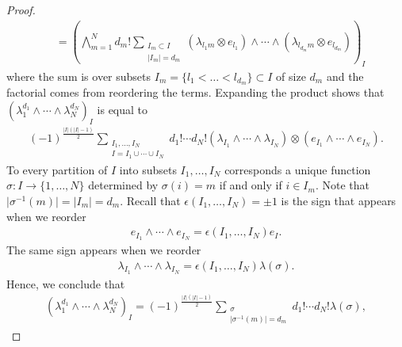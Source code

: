 \documentclass[a4paper,11pt]{amsart} %
\newcommand{\8}{\infty}
\theoremstyle{mytheoremstyle}
\theoremstyle{remark}
\numberwithin{equation}{section}
\begin{document}
\begin{proof}
\begin{align}
& = \left ( \bigwedge_{m=1}^N d_m! \sum_{\substack{I_m \subset I \\ \vert I_m \vert =d_m}} (\lambda_{l_1m} \otimes e_{l_1}) \wedge \cdots \wedge (\lambda_{l_{d_m}m} \otimes e_{l_{d_m}})  \right )_I
\end{align}
where the sum is over subsets $I_m=\{l_1< \dots <l_{d_m}\} \subset I$ of size $d_m$ and the factorial comes from reordering the terms. Expanding the product shows that $(\lambda_1^{d_1} \wedge \cdots \wedge \lambda_N^{d_N})_I$ is equal to
\begin{align}
(-1)^{\frac{\vert I \vert(\vert I \vert-1)}{2}}\sum_{\substack{I_1, \dots,I_N \\ I=I_1 \cup \cdots \cup I_N}} d_1! \cdots d_N!  (\lambda_{I_1} \wedge \cdots \wedge \lambda_{I_N} ) \otimes ( e_{I_1} \wedge \cdots \wedge e_{I_N}).
\end{align}
To every partition of $I$ into subsets $I_1,\dots,I_N$ corresponds a unique function $\sigma \colon  I \longrightarrow \{1, \dots, N\}$ determined by $\sigma(i)=m$ if and only if $i \in I_{m}$. Note that $\vert \sigma^{-1}(m) \vert=\vert I_m \vert=d_m$. Recall that $\epsilon(I_1, \dots, I_N) = \pm 1$ is the sign that appears when we reorder
\begin{align}
e_{I_1} \wedge \cdots \wedge e_{I_N}=\epsilon(I_1, \dots, I_N) e_I.
\end{align}
The same sign appears when we reorder
\begin{align}
\lambda_{I_1} \wedge \cdots \wedge \lambda_{I_N}=\epsilon(I_1, \dots, I_N) \lambda(\sigma).
\end{align}
Hence, we conclude that
\begin{align}
(\lambda_1^{d_1} \wedge \cdots \wedge \lambda_N^{d_N})_I= (-1)^{\frac{\vert I \vert(\vert I \vert-1)}{2}}\sum_{\substack{\sigma \\ \vert \sigma^{-1}(m) \vert =d_m}} d_1! \cdots d_N! \lambda(\sigma),

\end{align}
\end{proof}
\end{document}
